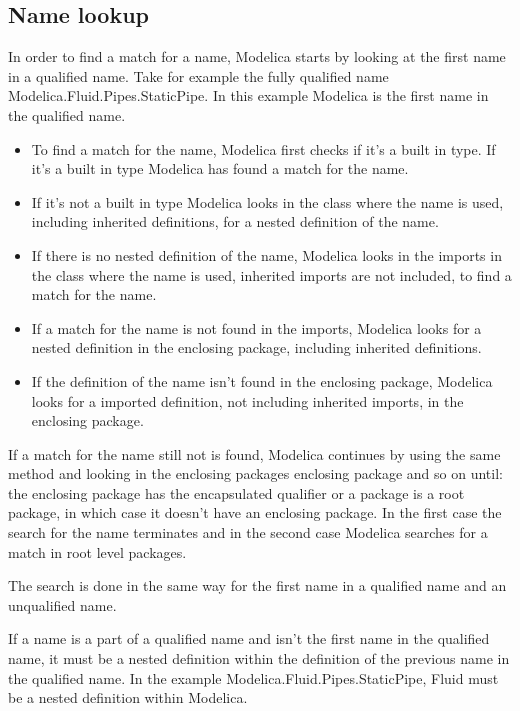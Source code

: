 \documentclass{cslthse-msc}
\begin{document}
\subsection{Name lookup}
In order to find a match for a name, Modelica starts by looking at the first name in a qualified name. Take for example the fully qualified name Modelica.Fluid.Pipes.StaticPipe. In this example Modelica is the first name in the qualified name.
\begin{itemize}
\item To find a match for the name, Modelica first checks if it's a built in type. If it's a built in type Modelica has found a match for the name.

\item If it's not a built in type Modelica looks in the class where the name is used, including inherited definitions, for a nested definition of the name. 

\item If there is no nested definition of the name, Modelica looks in the imports in the class where the name is used, inherited imports are not included, to find a match for the name.

\item If a match for the name is not found in the imports, Modelica looks for a nested definition in the enclosing package, including inherited definitions.

\item If the definition of the name isn't found in the enclosing package, Modelica looks for a imported definition, not including inherited imports, in the enclosing package.
\end{itemize}
If a match for the name still not is found, Modelica continues by using the same method and looking in the enclosing packages enclosing package and so on until: the enclosing package has the encapsulated qualifier or a package is a root package, in which case it doesn't have an enclosing package. In the first case the search for the name terminates and in the second case Modelica searches for a match in root level packages.

The search is done in the same way for the first name in a qualified name and an unqualified name.

If a name is a part of a qualified name and isn't the first name in the qualified name, it must be a nested definition within the definition of the previous name in the qualified name. In the example Modelica.Fluid.Pipes.StaticPipe, Fluid must be a nested definition within Modelica.\cite{modelicamodelica, tillermodelica}
\end{document}
